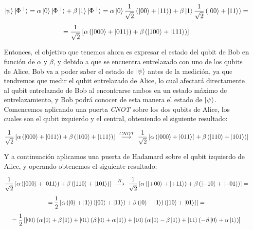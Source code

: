\documentclass[12pt]{article}
\numberwithin{equation}{section} %
\begin{document}
    \begin{gather*}
        \ket{\psi} \ket{\Phi^{+}} = \alpha \ket{0} \ket{\Phi^{+}} + \beta \ket{1} \ket{\Phi^{+}} = \alpha \ket{0} \frac{1}{\sqrt{2}} \left( \ket{0 0} + \ket{1 1} \right) + \beta \ket{1} \frac{1}{\sqrt{2}} \left( \ket{0 0} + \ket{1 1} \right) = \\[5pt]
        = \frac{1}{\sqrt{2}} \left[ \alpha \left( \ket{0 0 0} + \ket{0 1 1} \right) + \beta \left( \ket{1 0 0} + \ket{1 1 1} \right)\right]
    \end{gather*}

    \vspace{2.5mm}

    Entonces, el objetivo que tenemos ahora es expresar el estado del qubit de Bob en función de \( \alpha \) y \( \beta \), y debido a que se encuentra entrelazado con uno de los qubits de Alice, Bob va a poder saber el estado de \( \ket{\psi} \) antes de la medición, ya que tendremos que medir el qubit entrelazado de Alice, lo cual afectará directamente al qubit entrelazado de Bob al encontrarse ambos en un estado máximo de entrelazamiento, y Bob podrá conocer de esta manera el estado de \( \ket{\psi} \). Comencemos aplicando una puerta \textit{CNOT} sobre los dos qubits de Alice, los cuales son el qubit izquierdo y el central, obteniendo el siguiente resultado:

    \begin{equation*}
        \frac{1}{\sqrt{2}} \left[ \alpha \left( \ket{0 0 0} + \ket{0 1 1} \right) + \beta \left( \ket{1 0 0} + \ket{1 1 1} \right)\right] \ \overset{\textit{CNOT}}{\longrightarrow} \ \frac{1}{\sqrt{2}} \left[ \alpha \left( \ket{0 0 0} + \ket{0 1 1} \right) + \beta \left( \ket{1 1 0} + \ket{1 0 1} \right)\right]
    \end{equation*}

    \vspace{2.5mm}

    Y a continuación aplicamos una puerta de Hadamard sobre el qubit izquierdo de Alice, y operando obtenemos el siguiente resultado:

    \begin{gather*}
        \frac{1}{\sqrt{2}} \left[ \alpha \left( \ket{0 0 0} + \ket{0 1 1} \right) + \beta \left( \ket{1 1 0} + \ket{1 0 1} \right)\right] \ \overset{H}{\longrightarrow} \ \frac{1}{\sqrt{2}} \left[ \alpha \left( \ket{+ 0 0} + \ket{+ 1 1} \right) + \beta \left( \ket{- 1 0} + \ket{- 0 1} \right)\right] = \\[5pt]
        = \frac{1}{2} \left[ \alpha \left( \ket{0} + \ket{1} \right) \left( \ket{0 0} + \ket{1 1} \right) + \beta \left( \ket{0} - \ket{1} \right) \left( \ket{1 0} + \ket{0 1} \right) \right] = \\[5pt]
        = \frac{1}{2} \left[ \ket{0 0} \left( \alpha \ket{0} + \beta \ket{1} \right) + \ket{0 1} \left( \beta \ket{0} + \alpha \ket{1} \right) + \ket{1 0} \left( \alpha \ket{0} - \beta \ket{1} \right) + \ket{1 1} \left( - \beta \ket{0} + \alpha \ket{1} \right) \right]
    \end{gather*}
\end{document}
